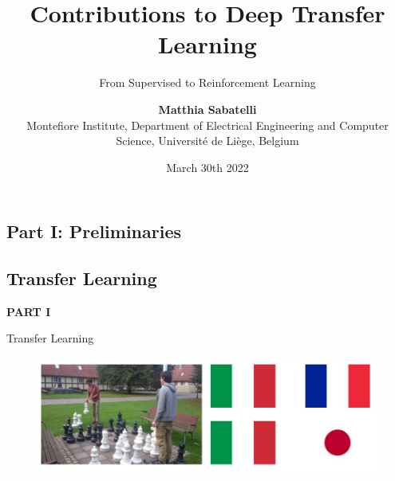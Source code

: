 \documentclass{beamer}
\title{Contributions to Deep Transfer Learning}
\subtitle{From Supervised to Reinforcement Learning}
\author{\textbf{Matthia Sabatelli} \\ Montefiore Institute, Department of Electrical Engineering and Computer Science, Universit\'e de Li\`ege, Belgium}
\date{March 30th 2022}
\begin{document}
\frame{\titlepage} 


\begin{frame}
	\section{Part I: Preliminaries}
	\subsection{Transfer Learning}

	\begin{center}
		\textcolor{skymagenta}{\textbf{PART I}}
	\end{center}
\end{frame}

\begin{frame}{Transfer Learning}
	\begin{figure}
		\includegraphics[width=1\textwidth]{figures/example}
	\end{figure}

\end{frame}
\end{document}
